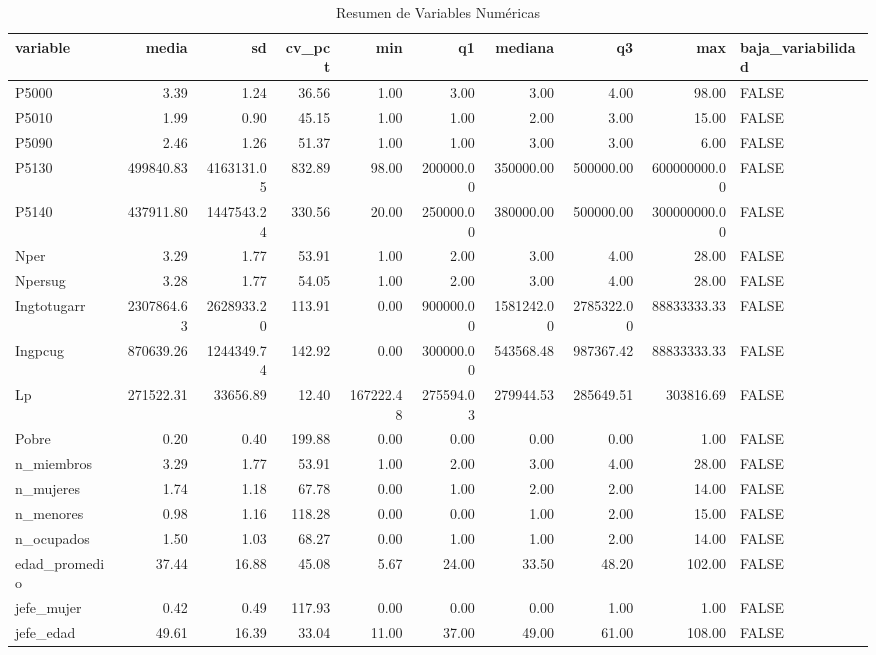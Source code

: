 \begin{table}[ht]
\centering
\begin{tabular}{lrrrrrrrrl}
  \toprule
variable & media & sd & cv\_pct & min & q1 & mediana & q3 & max & baja\_variabilidad \\ 
  \midrule
P5000 & 3.39 & 1.24 & 36.56 & 1.00 & 3.00 & 3.00 & 4.00 & 98.00 & FALSE \\ 
  P5010 & 1.99 & 0.90 & 45.15 & 1.00 & 1.00 & 2.00 & 3.00 & 15.00 & FALSE \\ 
  P5090 & 2.46 & 1.26 & 51.37 & 1.00 & 1.00 & 3.00 & 3.00 & 6.00 & FALSE \\ 
  P5130 & 499840.83 & 4163131.05 & 832.89 & 98.00 & 200000.00 & 350000.00 & 500000.00 & 600000000.00 & FALSE \\ 
  P5140 & 437911.80 & 1447543.24 & 330.56 & 20.00 & 250000.00 & 380000.00 & 500000.00 & 300000000.00 & FALSE \\ 
  Nper & 3.29 & 1.77 & 53.91 & 1.00 & 2.00 & 3.00 & 4.00 & 28.00 & FALSE \\ 
  Npersug & 3.28 & 1.77 & 54.05 & 1.00 & 2.00 & 3.00 & 4.00 & 28.00 & FALSE \\ 
  Ingtotugarr & 2307864.63 & 2628933.20 & 113.91 & 0.00 & 900000.00 & 1581242.00 & 2785322.00 & 88833333.33 & FALSE \\ 
  Ingpcug & 870639.26 & 1244349.74 & 142.92 & 0.00 & 300000.00 & 543568.48 & 987367.42 & 88833333.33 & FALSE \\ 
  Lp & 271522.31 & 33656.89 & 12.40 & 167222.48 & 275594.03 & 279944.53 & 285649.51 & 303816.69 & FALSE \\ 
  Pobre & 0.20 & 0.40 & 199.88 & 0.00 & 0.00 & 0.00 & 0.00 & 1.00 & FALSE \\ 
  n\_miembros & 3.29 & 1.77 & 53.91 & 1.00 & 2.00 & 3.00 & 4.00 & 28.00 & FALSE \\ 
  n\_mujeres & 1.74 & 1.18 & 67.78 & 0.00 & 1.00 & 2.00 & 2.00 & 14.00 & FALSE \\ 
  n\_menores & 0.98 & 1.16 & 118.28 & 0.00 & 0.00 & 1.00 & 2.00 & 15.00 & FALSE \\ 
  n\_ocupados & 1.50 & 1.03 & 68.27 & 0.00 & 1.00 & 1.00 & 2.00 & 14.00 & FALSE \\ 
  edad\_promedio & 37.44 & 16.88 & 45.08 & 5.67 & 24.00 & 33.50 & 48.20 & 102.00 & FALSE \\ 
  jefe\_mujer & 0.42 & 0.49 & 117.93 & 0.00 & 0.00 & 0.00 & 1.00 & 1.00 & FALSE \\ 
  jefe\_edad & 49.61 & 16.39 & 33.04 & 11.00 & 37.00 & 49.00 & 61.00 & 108.00 & FALSE \\ 
   \bottomrule
\end{tabular}
\caption{Resumen de Variables Numéricas} 
\label{tab:num_summary}
\end{table}
